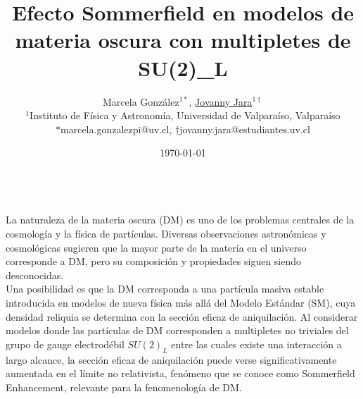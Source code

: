 \documentclass[11pt,spanish]{article}
\title{\vspace{-5mm}\fontsize{16pt}{10pt}\selectfont \textbf{Efecto Sommerfield en modelos de materia oscura con multipletes de SU(2)_L}} %
\author{
\normalsize Marcela González$^{1*}$, \underline{Jovanny Jara}$^{1 \dagger}$
 \\ \vspace{-1mm}
\small  $^1$Instituto de Física y Astronomía, Universidad de Valparaíso, Valparaíso \\ %
\small $*$marcela.gonzalezpi@uv.cl, $\dagger$jovanny.jara@estudiantes.uv.cl}
\date{\today}
\newcommand{\seccion}[1]{\noindent {\Large\textbf{#1}}\\}
\begin{document}
\maketitle
\thispagestyle{fancy} %

\seccion{Resumen}
\noindent
La naturaleza de la materia oscura (DM) es uno de los problemas centrales de la cosmología y la física de partículas. Diversas observaciones astronómicas y cosmológicas sugieren que la mayor parte de la materia en el universo corresponde a DM, pero su composición y propiedades siguen siendo desconocidas.\\
Una posibilidad es que la DM corresponda a una partícula masiva estable introducida en modelos de nueva física más allá del Modelo Estándar (SM), cuya densidad reliquia se determina con la sección eficaz de aniquilación. Al considerar modelos donde las partículas de DM corresponden a multipletes no triviales del grupo de gauge electrodébil $SU(2)_L$ entre las cuales existe una interacción a largo alcance, la sección eficaz de aniquilación puede verse significativamente aumentada en el límite no relativista, fenómeno que se conoce como Sommerfield Enhancement, relevante para la fenomenología de DM.\\
\end{document}
